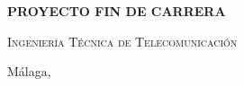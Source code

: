 \begin{spacing}{1}
\begin{titlepage}
	\bigskip
	
	\begin{center}\Large\textbf{\textsf{PROYECTO FIN DE CARRERA}}\end{center}
	
	\medskip
	
	\begin{center}
		\Huge
		\sffamily\scshape
		\pfctitlename
	\end{center}
	
	\medskip
	
	\begin{center}
		\Huge
		\scshape%
		\textsf{Ingeniería Técnica de Telecomunicación}
	\end{center}
	
	\vfill
	
	{\large Málaga, \pfcanno \hfill \pfcauthorname}
\end{titlepage}
\end{spacing}